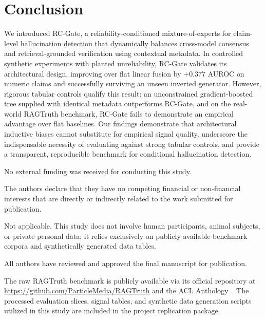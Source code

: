 \documentclass[pdflatex,sn-mathphys,Numbered]{sn-jnl}
\begin{document}
\section{Conclusion}\label{sec:conclusion}

We introduced RC-Gate, a reliability-conditioned mixture-of-experts for claim-level hallucination detection that dynamically balances cross-model consensus and retrieval-grounded verification using contextual metadata. In controlled synthetic experiments with planted unreliability, RC-Gate validates its architectural design, improving over flat linear fusion by $+0.377$ AUROC on numeric claims and successfully surviving an unseen inverted generator. However, rigorous tabular controls qualify this result: an unconstrained gradient-boosted tree supplied with identical metadata outperforms RC-Gate, and on the real-world RAGTruth benchmark, RC-Gate fails to demonstrate an empirical advantage over flat baselines. Our findings demonstrate that architectural inductive biases cannot substitute for empirical signal quality, underscore the indispensable necessity of evaluating against strong tabular controls, and provide a transparent, reproducible benchmark for conditional hallucination detection.

\backmatter

No external funding was received for conducting this study.

The authors declare that they have no competing financial or non-financial interests that are directly or indirectly related to the work submitted for publication.

Not applicable. This study does not involve human participants, animal subjects, or private personal data; it relies exclusively on publicly available benchmark corpora and synthetically generated data tables.

All authors have reviewed and approved the final manuscript for publication.

The raw RAGTruth benchmark is publicly available via its official repository at \url{https://github.com/ParticleMedia/RAGTruth} and the ACL Anthology~\cite{niu2024ragtruth}. The processed evaluation slices, signal tables, and synthetic data generation scripts utilized in this study are included in the project replication package.
\end{document}
